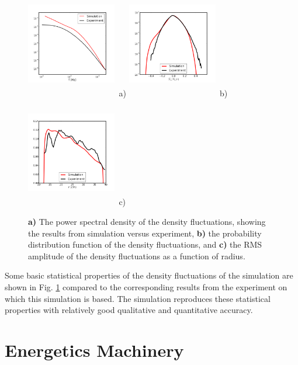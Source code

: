 \documentclass[twocolumn,showpacs,preprintnumbers,amsmath,amssymb]{revtex4}
\begin{document}
\begin{figure}
\includegraphics[width=0.35\textwidth,height=48mm]{sim_vs_exp_spec}~a)
\hfil
\includegraphics[width=0.35\textwidth,height=48mm]{pdf}~b)
\hfil
\includegraphics[width=0.35\textwidth,height=48mm]{radial_rms}~c)
\hfil
\caption{\textbf{a)} The power spectral density of the density fluctuations, showing the results from simulation versus experiment, \textbf{b)} the probability distribution function
of the density fluctuations, and \textbf{c)} the RMS amplitude of the density fluctuations as a function of radius.}
\label{validation}
\end{figure}

Some basic statistical properties of the density fluctuations of the simulation are shown in Fig. \ref{validation} compared to the corresponding results from the experiment on which
this simulation is based. The simulation reproduces these statistical properties with relatively good qualitative and quantitative accuracy.

\section{Energetics Machinery}
\label{sec_energetics_machinery}
\end{document}
